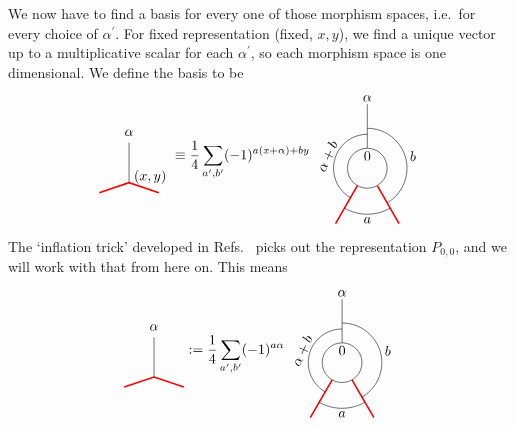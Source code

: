 We now have to find a basis for every one of those morphism spaces, i.e.\ for every choice of $\alpha^\prime$. For fixed representation (fixed, $x,y$), we find a unique vector up to a multiplicative scalar for each $\alpha^\prime$, so each morphism space is one dimensional. We define the basis to be
	\begin{equation}
		\begin{tikzpicture}[scale=1,baseline=(current bounding box.center)]
			\draw[red,line width=0.4mm] (0,-.25) -- (.75,0) -- (1.5,-.25);
			\draw (0.75,0) -- (0.75,1) node [pos=1.25] {$\alpha$};
			\node[above,right] at (.75,.15) {$(x,y)$};
		\end{tikzpicture}\equiv
		\frac{1}{4}
		\sum_{a^\prime,b^\prime}(-1)^{a(x+\alpha)+b y}
		\begin{tikzpicture}[scale=1,baseline=(current bounding box.center)]
		\draw (0,0) circle (0.5cm);
		\draw[red,line width=0.4mm]
		\foreach \a in {-60, -120} {
			(\a:0.5) -- (\a:1.6)
		};
		\draw ([shift=(-60:1cm)]0,0) arc (-60:90:1cm);
		\draw ([shift=(-120:1.15cm)]0,0) arc (-120:-60:1.15cm);
		\draw ([shift=(240:0.85cm)]0,0) arc (240:90:0.85cm);
		\draw[] (90:0.5) -- (90:1.6);
		\node at (90:.3cm){$0$};\node at (90:1.75cm){$\alpha$};
		\node[rotate=65] at (-1,0.3) {$\alpha+b$};
		\node at (1.15,0.3) {$b$};
		\node at (0,-1.3) {$a$};
		\end{tikzpicture}
	\end{equation}
The `inflation trick' developed in Refs.~\cite{BBJ18,BB19a,BB19b} picks out the representation $P_{0,0}$, and we will work with that from here on. This means
	\begin{equation}
	\begin{tikzpicture}[scale=1,baseline=(current bounding box.center)]
	\draw[red,line width=0.4mm] (0,-.25) -- (.75,0) -- (1.5,-.25);
	\draw (0.75,0) -- (0.75,1) node [pos=1.25] {$\alpha$};
	\end{tikzpicture}:=
	\frac{1}{4}
	\sum_{a^\prime,b^\prime}(-1)^{a\alpha}
	\begin{tikzpicture}[scale=1,baseline=(current bounding box.center)]
	\draw (0,0) circle (0.5cm);
	\draw[red,line width=0.4mm]
	\foreach \a in {-60, -120} {
		(\a:0.5) -- (\a:1.6)
	};
	\draw ([shift=(-60:1cm)]0,0) arc (-60:90:1cm);
	\draw ([shift=(-120:1.15cm)]0,0) arc (-120:-60:1.15cm);
	\draw ([shift=(240:0.85cm)]0,0) arc (240:90:0.85cm);
	\draw[] (90:0.5) -- (90:1.6);
	\node at (90:.3cm){$0$};\node at (90:1.75cm){$\alpha$};
	\node[rotate=65] at (-1,0.3) {$\alpha+b$};
	\node at (1.15,0.3) {$b$};
	\node at (0,-1.3) {$a$};
	\end{tikzpicture}
	\end{equation}

